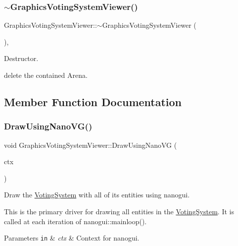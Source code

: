 \subsubsection{\texorpdfstring{$\sim$\+Graphics\+Voting\+System\+Viewer()}{~GraphicsVotingSystemViewer()}}
{\footnotesize\ttfamily Graphics\+Voting\+System\+Viewer\+::$\sim$\+Graphics\+Voting\+System\+Viewer (\begin{DoxyParamCaption}{ }\end{DoxyParamCaption})\hspace{0.3cm}{\ttfamily [inline]}, {\ttfamily [override]}}



Destructor. 

{\ttfamily delete} the contained Arena. 

\subsection{Member Function Documentation}
\mbox{\label{classGraphicsVotingSystemViewer_a01dee1a5993bbbfe5e0fa67f0572557f}} 
\subsubsection{\texorpdfstring{Draw\+Using\+Nano\+V\+G()}{DrawUsingNanoVG()}}
{\footnotesize\ttfamily void Graphics\+Voting\+System\+Viewer\+::\+Draw\+Using\+Nano\+VG (\begin{DoxyParamCaption}\item[{N\+V\+Gcontext $\ast$}]{ctx }\end{DoxyParamCaption})\hspace{0.3cm}{\ttfamily [override]}}



Draw the \hyperlink{classVotingSystem}{Voting\+System} with all of its entities using {\ttfamily nanogui}. 

This is the primary driver for drawing all entities in the \hyperlink{classVotingSystem}{Voting\+System}. It is called at each iteration of {\ttfamily nanogui\+::mainloop()}.


\begin{DoxyParams}[1]{Parameters}
\mbox{\tt in}  & {\em ctx} & Context for nanogui. \\
\hline
\end{DoxyParams}
\mbox{\label{classGraphicsVotingSystemViewer_a75249f28efd57cb648ace4a09b465324}} 
